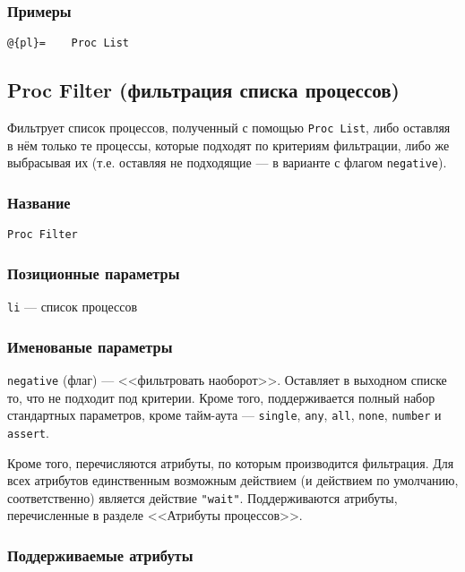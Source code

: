 \documentclass[11pt]{book} %
\begin{document}
\subsubsection*{Примеры}
\begin{verbatim}@{pl}=    Proc List\end{verbatim}



\subsection{Proc Filter (фильтрация списка процессов)}
Фильтрует список процессов, полученный с помощью \verb"Proc List", либо оставляя в нём только те процессы, которые подходят по критериям фильтрации, либо же выбрасывая их (т.е. оставляя не подходящие --- в варианте с флагом \verb"negative").



\subsubsection*{Название} 
\verb"Proc Filter"

\subsubsection*{Позиционные параметры} 

\verb"li" --- список процессов

\subsubsection*{Именованые параметры} 


\verb"negative" (флаг) --- <<фильтровать наоборот>>. Оставляет в выходном списке то, что не подходит под критерии. Кроме того, поддерживается полный набор стандартных параметров, кроме тайм-аута --- \verb"single", \verb|any|, \verb|all|, \verb|none|, \verb|number| и \verb"assert".

Кроме того, перечисляются атрибуты, по которым производится фильтрация. Для всех атрибутов единственным возможным действием (и действием по умолчанию, соответственно) является действие \verb|"wait"|. Поддерживаются атрибуты, перечисленные в разделе <<Атрибуты процессов>>.

\subsubsection*{Поддерживаемые атрибуты} 
\end{document}
